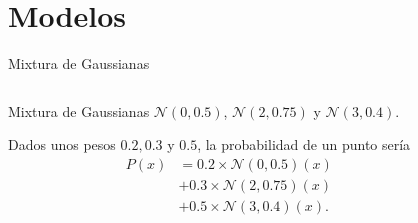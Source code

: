 \documentclass[aspectratio=169]{beamer}
\begin{document}
  \section{Modelos}
  \begin{frame}{Mixtura de Gaussianas}
    \begin{columns}
      \begin{column}{0.5\textwidth}
        Mixtura de Gaussianas \(\mathcal{N}(0, 0.5)\), \(\mathcal{N}(2, 0.75)\) y \(\mathcal{N}(3, 0.4)\).

        Dados unos pesos \(0.2, 0.3\) y \(0.5\), la probabilidad de un punto sería
        \[
          \begin{aligned}
            P(x) &= 0.2\times \mathcal{N}(0, 0.5)(x)\\
            &+ 0.3\times \mathcal{N}(2, 0.75)(x)\\
            &+ 0.5\times \mathcal{N}(3, 0.4)(x).
            \end{aligned}
        \]

      \end{column}
      \begin{column}{0.6\textwidth}
    \end{column}
  \end{columns}
  \end{frame}
\end{document}
